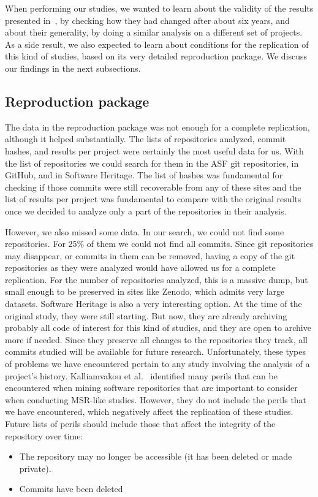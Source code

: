 When performing our studies, we wanted to learn about the validity of the results presented in~\cite{tufano2017there}, by checking how they had changed after about six years, and about their generality, by doing a similar analysis on a different set of projects. As a side result, we also expected to learn about conditions for the replication of this kind of studies, based on its very detailed reproduction package. We discuss our findings in the next subsections.

\subsection{Reproduction package}

The data in the reproduction package was not enough for a complete replication, although it helped substantially. The lists of repositories analyzed, commit hashes, and results per project were certainly the most useful data for us. With the list of repositories we could search for them in the ASF git repositories, in GitHub, and in Software Heritage. The list of hashes was fundamental for checking if those commits were still recoverable from any of these sites and the list of results per project was fundamental to compare with the original results once we decided to analyze only a part of the repositories in their analysis.

However, we also missed some data. In our search, we could not find some repositories. For 25\% of them we could not find all commits. Since git repositories may disappear, or commits in them can be removed, having a copy of the git repositories as they were analyzed would have allowed us for a complete replication. For the number of repositories analyzed, this is a massive dump, but small enough to be preserved in sites like Zenodo, which admits very large datasets. Software Heritage is also a very interesting option. At the time of the original study, they were still starting. But now, they are already archiving probably all code of interest for this kind of studies, and they are open to archive more if needed. Since they preserve all changes to the repositories they track, all commits studied will be available for future research.
Unfortunately, these types of problems we have encountered pertain to any study involving the analysis of a project's history. Kalliamvakou et al.~\cite{kalliamvakou2016depth} identified many perils that can be encountered when mining software repositories that are important to consider when conducting MSR-like studies. 
However, they do not include the perils that we have encountered, which negatively affect the replication of these studies. 
Future lists of perils should include those that affect the integrity of the repository over time:
\begin{itemize}
    \item The repository may no longer be accessible (it has been deleted or made private).
    \item Commits have been deleted
\end{itemize}

